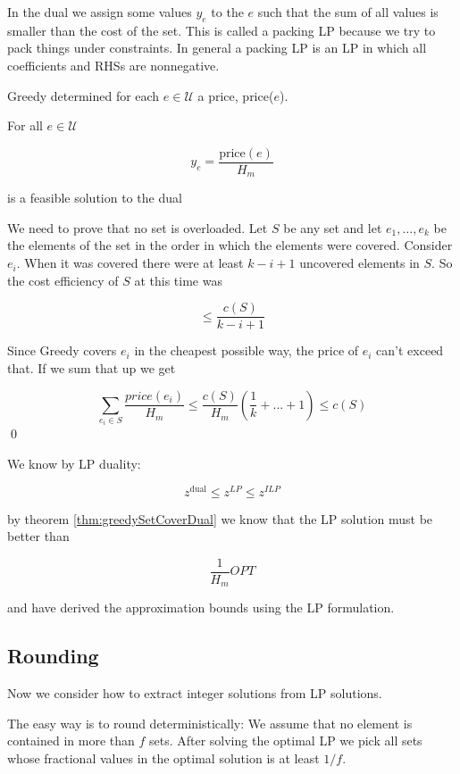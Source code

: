 In the dual we assign some values $y_e$ to the $e$ such that the sum of all values is smaller than the cost of the set. This is called a packing LP because we try to pack things under constraints. In general a packing LP is an LP in which all coefficients and RHSs are nonnegative.

\begin{thm} \label{thm:greedySetCoverDual}Greedy determined for each $e\in \mathcal{U}$ a price, price($e$).

For all $e\in \mathcal{U}$

\[y_e= \frac{\text{price}(e)}{H_m}\]

is a feasible solution to the dual
\end{thm}

\begin{pr} We need to prove that no set is overloaded. Let $S$ be any set and let $e_1,\ldots, e_k$ be the elements of the set in the order in which the elements were covered. Consider $e_i$. When it was covered there were at least $k-i+1$ uncovered elements in $S$. So the cost efficiency of $S$ at this time was 

\[\leq \frac{c(S)}{k-i+1}\]

Since Greedy covers $e_i$ in the cheapest possible way, the price of $e_i$ can't exceed that. If we sum that up we get

\[\sum_{e_i\in S} \frac{price(e_i)}{H_m} \leq \frac{c(S)}{H_m}\left(\frac{1}{k}+\ldots+1\right) \leq c(S)\]
\qed \end{pr}

We know by LP duality:

\[z^{\text{dual}} \leq z^{LP} \leq z^{ILP}\]

by theorem \ref{thm:greedySetCoverDual} we know that the LP solution must be better than 

\[\frac{1}{H_m} OPT\]

and have derived the approximation bounds using the LP formulation.

\subsection{Rounding}

Now we consider how to extract integer solutions from LP solutions.

The easy way is to round deterministically: We assume that no element is contained in more than $f$ sets. After solving the optimal LP we pick all sets whose fractional values in the optimal solution is at least $1/f$. 

